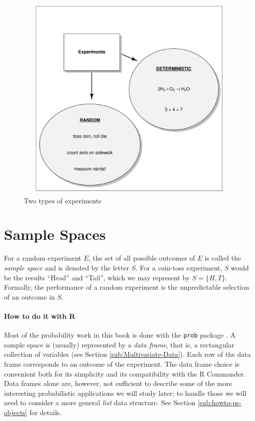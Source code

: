 \documentclass[captions=tableheading]{scrbook}
\begin{document}
\begin{figure}[th]
    \includegraphics[width=5in, height=4in]{img/diagram.pdf}
    \caption[Two types of experiments]{Two types of experiments}
    \label{fig:diagram}
  \end{figure}
\section{Sample Spaces}
\label{sec-4-1}

\label{sec:Sample-Spaces}

For a random experiment \(E\), the set of all possible outcomes of \(E\) is called the \emph{sample space} and is denoted by the letter \(S\). For a coin-toss experiment, \(S\) would be the results ``Head'' and ``Tail'', which we may represent by \( S = \{H,T \} \). Formally, the performance of a random experiment is the unpredictable selection of an outcome in \(S\).

\paragraph*{How to do it with \textsf{R}}

Most of the probability work in this book is done with the \texttt{prob} package \cite{Kernsprob}. A sample space is (usually) represented by a \emph{data frame}, that is, a rectangular collection of variables (see Section \ref{sub:Multivariate-Data}). Each row of the data frame corresponds to an outcome of the experiment. The data frame choice is convenient both for its simplicity and its compatibility with the \textsf{R} Commander. Data frames alone are, however, not sufficient to describe some of the more interesting probabilistic applications we will study later; to handle those we will need to consider a more general \emph{list} data structure. See Section \ref{sub:howto-ps-objects} for details.
\end{document}
